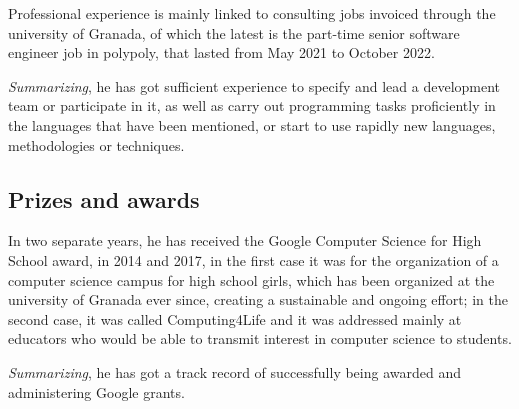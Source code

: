 \documentclass[a4paper,12pt]{article}
\begin{document}
Professional experience is mainly linked to consulting jobs invoiced through the
university of Granada, of which the latest is the part-time senior software
engineer job in polypoly, that lasted from May 2021 to October 2022.

{\em Summarizing}, he has got sufficient experience to specify and lead a development
team or participate in it, as well as carry out programming tasks proficiently
in the languages that have been mentioned, or start to use rapidly new
languages, methodologies or techniques.

\subsection{Prizes and awards}

In two separate years, he has received the Google Computer Science for High
School award, in 2014 and 2017, in the first case it was for the organization of
a computer science campus for high school girls, which has been organized at the
university of Granada ever since, creating a sustainable and ongoing effort; in
the second case, it was called Computing4Life and it was addressed mainly at
educators who would be able to transmit interest in computer science to
students.

{\em Summarizing}, he has got a track record of successfully being awarded and
administering Google grants.








\end{document}
